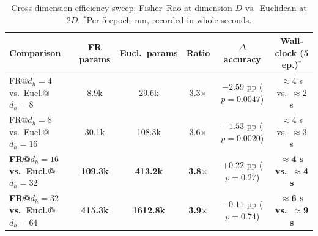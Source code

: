 \documentclass[11pt]{article}
\begin{document}
\begin{table}[h]
\centering\footnotesize
\setlength{\tabcolsep}{4pt}
\begin{tabular}{lccccc}
\toprule
Comparison & FR params & Eucl.\ params & Ratio & $\Delta$ accuracy & Wall-clock (5 ep.)$^{*}$ \\
\midrule
FR@$d_h{=}4$ vs.\ Eucl.@$d_h{=}8$ & 8.9k & 29.6k & 3.3$\times$ & $-2.59$ pp ($p=0.0047$) & $\approx$4 s vs.\ $\approx$2 s \\
FR@$d_h{=}8$ vs.\ Eucl.@$d_h{=}16$ & 30.1k & 108.3k & 3.6$\times$ & $-1.53$ pp ($p=0.0020$) & $\approx$4 s vs.\ $\approx$3 s \\
\textbf{FR@$d_h{=}16$ vs.\ Eucl.@$d_h{=}32$} & \textbf{109.3k} & \textbf{413.2k} & \textbf{3.8$\times$} & $+0.22$ pp ($p=0.27$) & \textbf{$\approx$4 s vs.\ $\approx$4 s} \\
\textbf{FR@$d_h{=}32$ vs.\ Eucl.@$d_h{=}64$} & \textbf{415.3k} & \textbf{1612.8k} & \textbf{3.9$\times$} & $-0.11$ pp ($p=0.74$) & \textbf{$\approx$6 s vs.\ $\approx$9 s} \\
\bottomrule
\end{tabular}
\caption{Cross-dimension efficiency sweep: Fisher--Rao at dimension $D$ vs.\ Euclidean at $2D$. $^{*}$Per 5-epoch run, recorded in whole seconds.}
\label{tab:efficiency}
\end{table}
\end{document}
